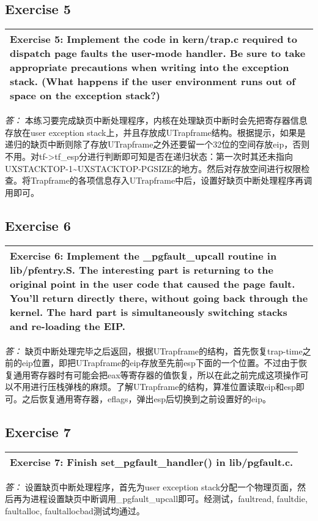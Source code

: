 \documentclass[11pt,a4paper]{article}
\newcommand{\exercise}[2]{
\begin{tabular}{|p{\textwidth}|}
\hline
#1: #2\\
\hline
\end{tabular}
\textit{\large{答：}}}
\begin{document}
\subsection{Exercise 5}
\exercise{Exercise 5}{Implement the code in kern/trap.c  required to dispatch page faults the user-mode handler. Be sure to take appropriate precautions when writing into the exception stack. (What happens if the user environment runs out of space on the exception stack?)}
本练习要完成缺页中断处理程序，内核在处理缺页中断时会先把寄存器信息存放在user exception stack上，并且存放成UTrapframe结构。根据提示，如果是递归的缺页中断则除了存放UTrapframe之外还要留一个32位的空间存放eip，否则不用。对tf->tf\_esp分进行判断即可知是否在递归状态：第一次时其还未指向UXSTACKTOP-1\~{}UXSTACKTOP-PGSIZE的地方。然后对存放空间进行权限检查。将Trapframe的各项信息存入UTrapframe中后，设置好缺页中断处理程序再调用即可。

\subsection{Exercise 6}
\exercise{Exercise 6}{Implement the \_pgfault\_upcall routine in lib/pfentry.S. The interesting part is returning to the original point in the user code that caused the page fault. You'll return directly there, without going back through the kernel. The hard part is simultaneously switching stacks and re-loading the EIP.}
缺页中断处理完毕之后返回，根据UTrapframe的结构，首先恢复trap-time之前的eip位置，即把UTrapframe的eip存放至先前esp下面的一个位置。不过由于恢复通用寄存器时有可能会把eax等寄存器的值恢复，所以在此之前完成这项操作可以不用进行压栈弹栈的麻烦。了解UTrapframe的结构，算准位置读取eip和esp即可。之后恢复通用寄存器，eflags，弹出esp后切换到之前设置好的eip。

\subsection{Exercise 7}
\exercise{Exercise 7}{Finish set\_pgfault\_handler() in lib/pgfault.c.}
设置缺页中断处理程序，首先为user exception stack分配一个物理页面，然后再为进程设置缺页中断调用\_pgfault\_upcall即可。经测试，faultread, faultdie, faultalloc, faultallocbad测试均通过。
\end{document}
